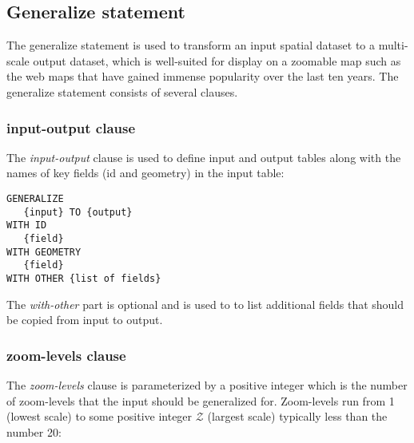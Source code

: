 

\subsection{Generalize statement}


The generalize statement is used to transform an input spatial dataset to a multi-scale output dataset, which is well-suited for display on a zoomable map such as the web maps that have gained immense popularity over the last ten years. The generalize statement consists of several clauses. 

\subsubsection{input-output clause}

The \emph{input-output} clause is used to define input and output tables along with the names of key fields (id and geometry) in the input table:

\begin{lstlisting}
GENERALIZE 
   {input} TO {output}
WITH ID
   {field}
WITH GEOMETRY 
   {field}
WITH OTHER {list of fields}
\end{lstlisting}

The \emph{with-other} part is optional and is used to to list additional fields that should be copied from input to output.

\subsubsection{zoom-levels clause}

The \emph{zoom-levels} clause is parameterized by a positive integer which is the number of zoom-levels that the input should be generalized for. Zoom-levels run from 1 (lowest scale) to some positive integer $\mathcal{Z}$ (largest scale) typically less than the number 20:

